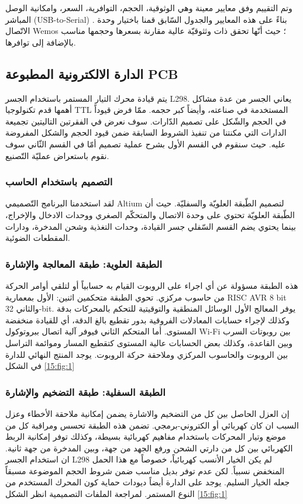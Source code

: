 وتم التقييم وفق معايير معينة وهي الوثوقية، الحجم، التوافرية، السعر، وامكانية الوصل المباشر (USB-to-Serial) . بناءً على هذه المعايير والجدول السّابق قمنا باختيار وحدة الاتّصال Wemos  ؛ حيث أنّها تحقق ذات وثثوقيّة عالية مقارنة بسعرها وحجمها مناسب بالإضافة إلى توافرها.

\subsection{الدارة الالكترونية المطبوعة PCB}

يتم قيادة محرك التيار المستمر باستخدام الجسر L298. يعاني الجسر من عدة مشاكل أهمها قدم تكنولوجيا TTL المستخدمة في صناعته، وأيضاً كبر حجمه. ممّا فرض قيوداً في الحجم والشّكل على تصميم الدّارات. سوف نعرض في الفقرتين التاليتين تجميعة الدارات التي مكنتنا من تنفيذ الشروط السابقة ضمن قيود الحجم والشكل المفروضة عليه. حيث سنقوم في القسم الأول بشرح عملية تصميم أمّا في القسم الثّاني سوف نقوم باستعراض عمليّة التّصنيع.

\subsubsection{التصميم باستخدام الحاسب}
لقد استخدمنا البرنامج التّصميمي Altium لتصميم الطّبقة العلويّة والسفليّة. حيث أن الطّبقة العلويّة تحتوي على وحدة الاتصال والمتحكّم الصغري ووحدات الادخال والإخراج، بينما يحتوي يضم القسم السّفلي جسر القيادة، وحدات التغذية وشحن المدخرة، ودارات المقطعات الضوئية. 

\subsubsection*{الطبقة العلوية:  طبقة المعالجة والإشارة}
 هذه الطبقة مسؤولة عن أي اجراء على الروبوت القيام به حسابياً أو لتلقي أوامر الحركة من حاسوب مركزي. تحوي الطبقة متحكمين اثنين: الأول بمعمارية RISC AVR 8 bit والثاني 32-bit. يوفر المعالج الأول الوسائل المنطقية والتوقيتية للتحكم بالمحركات بدقة وكذلك لإجراء حسابات المعادلات الفروقية بدور تقطيع بالغ الدقة، أي للقيادة منخفضة المستوى. أما المتحكم الثاني فيوفر آلية اتصال ببروتوكول Wi-Fi بين روبوتات السرب وبين القاعدة، وكذلك بعض الحسابات عالية المستوى كتقطيع المسار وموائمة التراسل بين الروبوت والحاسوب المركزي وملاحقة حركة الروبوت. يوجد المنتج النهائي للدارة في الشكل \ref{15:fig:1}
 
 \subsubsection*{الطبقة السفلية: طبقة التضخيم والإشارة}
 إن العزل الحاصل بين كل من التضخيم والاشارة يضمن إمكانية ملاحقة الأخطاء وعزل السبب ان كان كهربائي أو الكتروني-برمجي. تضمن هذه الطبقة تحسس ومراقبة كل من موضع وتيار المحركات باستخدام مفاهيم كهربائية بسيطة، وكذلك توفر إمكانية الربط الكهربائي بين كل من دارتي الشحن ورفع الجهد من جهة، وبين المدخرة من جهة ثانية.
 ان استخدام الجسر L298 لم يكن الخيار الأنسب كهربائياً، خصوصاً مع هذا الحمل المنخفض نسبياً. لكن عدم توفر بديل مناسب ضمن شروط الحجم الموضوعة مسبقاً جعله الخيار السليم. يوجد على الدارة أيضاً ديودات حماية كون المحرك المستخدم من النوع المستمر. لمراجعة الملفات التصميمية انظر الشكل \ref{15:fig:1}
 
